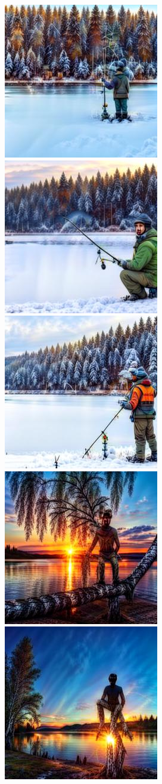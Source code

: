 \begin{figure}[h!]
\begin{subfigure}[t]{0.32\linewidth}
	\includegraphics[width=0.320\linewidth]{figs/samples_appendix_3/draft1k_cfg_2_ode_prompt_65_image_1.jpg}\;%
	\includegraphics[width=0.320\linewidth]{figs/samples_appendix_3/draft1k_cfg_2_ode_prompt_65_image_2.jpg}\;%
	\includegraphics[width=0.320\linewidth]{figs/samples_appendix_3/draft1k_cfg_2_ode_prompt_65_image_3.jpg}\\ 
	\includegraphics[width=0.320\linewidth]{figs/samples_appendix_3/draft1k_cfg_2_ode_prompt_69_image_1.jpg}\;%
	\includegraphics[width=0.320\linewidth]{figs/samples_appendix_3/draft1k_cfg_2_ode_prompt_69_image_2.jpg}\;%

\end{subfigure}
\end{figure}
